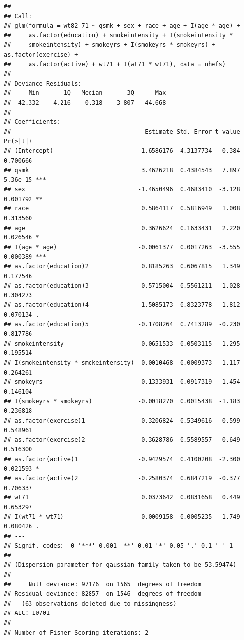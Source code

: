 \documentclass[
  10pt,
]{book}
\begin{document}
\begin{verbatim}
## 
## Call:
## glm(formula = wt82_71 ~ qsmk + sex + race + age + I(age * age) + 
##     as.factor(education) + smokeintensity + I(smokeintensity * 
##     smokeintensity) + smokeyrs + I(smokeyrs * smokeyrs) + as.factor(exercise) + 
##     as.factor(active) + wt71 + I(wt71 * wt71), data = nhefs)
## 
## Deviance Residuals: 
##     Min       1Q   Median       3Q      Max  
## -42.332   -4.216   -0.318    3.807   44.668  
## 
## Coefficients:
##                                      Estimate Std. Error t value Pr(>|t|)    
## (Intercept)                        -1.6586176  4.3137734  -0.384 0.700666    
## qsmk                                3.4626218  0.4384543   7.897 5.36e-15 ***
## sex                                -1.4650496  0.4683410  -3.128 0.001792 ** 
## race                                0.5864117  0.5816949   1.008 0.313560    
## age                                 0.3626624  0.1633431   2.220 0.026546 *  
## I(age * age)                       -0.0061377  0.0017263  -3.555 0.000389 ***
## as.factor(education)2               0.8185263  0.6067815   1.349 0.177546    
## as.factor(education)3               0.5715004  0.5561211   1.028 0.304273    
## as.factor(education)4               1.5085173  0.8323778   1.812 0.070134 .  
## as.factor(education)5              -0.1708264  0.7413289  -0.230 0.817786    
## smokeintensity                      0.0651533  0.0503115   1.295 0.195514    
## I(smokeintensity * smokeintensity) -0.0010468  0.0009373  -1.117 0.264261    
## smokeyrs                            0.1333931  0.0917319   1.454 0.146104    
## I(smokeyrs * smokeyrs)             -0.0018270  0.0015438  -1.183 0.236818    
## as.factor(exercise)1                0.3206824  0.5349616   0.599 0.548961    
## as.factor(exercise)2                0.3628786  0.5589557   0.649 0.516300    
## as.factor(active)1                 -0.9429574  0.4100208  -2.300 0.021593 *  
## as.factor(active)2                 -0.2580374  0.6847219  -0.377 0.706337    
## wt71                                0.0373642  0.0831658   0.449 0.653297    
## I(wt71 * wt71)                     -0.0009158  0.0005235  -1.749 0.080426 .  
## ---
## Signif. codes:  0 '***' 0.001 '**' 0.01 '*' 0.05 '.' 0.1 ' ' 1
## 
## (Dispersion parameter for gaussian family taken to be 53.59474)
## 
##     Null deviance: 97176  on 1565  degrees of freedom
## Residual deviance: 82857  on 1546  degrees of freedom
##   (63 observations deleted due to missingness)
## AIC: 10701
## 
## Number of Fisher Scoring iterations: 2
\end{verbatim}
\end{document}
